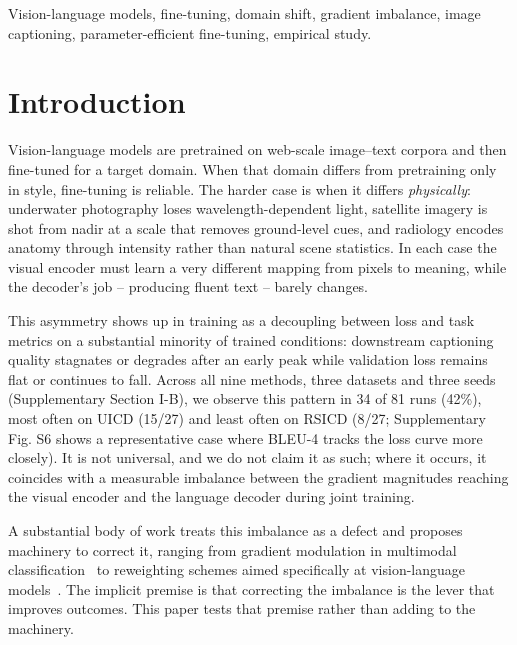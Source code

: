 \documentclass[journal]{IEEEtran}
\begin{document}
\begin{IEEEkeywords}
Vision-language models, fine-tuning, domain shift, gradient
imbalance, image captioning, parameter-efficient fine-tuning,
empirical study.
\end{IEEEkeywords}

\section{Introduction}

Vision-language models are pretrained on web-scale image--text
corpora and then fine-tuned for a target domain. When that domain
differs from pretraining only in style, fine-tuning is reliable. The harder case is when it differs \emph{physically}: underwater
photography loses wavelength-dependent light, satellite imagery is
shot from nadir at a scale that removes ground-level cues, and
radiology encodes anatomy through intensity rather than natural scene statistics. In each case the visual encoder must learn a very different mapping from pixels to meaning, while the decoder's job -- producing fluent text -- barely changes.

This asymmetry shows up in training as a decoupling between loss
and task metrics on a substantial minority of trained conditions:
downstream captioning quality stagnates or degrades after an
early peak while validation loss remains flat or continues to
fall. Across all nine methods, three datasets and three seeds
(Supplementary Section I-B), we observe this pattern in
34 of 81 runs (42\%), most often on UICD (15/27) and least often
on RSICD (8/27; Supplementary Fig. S6 shows a representative
case where BLEU-4 tracks the loss curve more closely). It is not
universal, and we do not claim it as such; where it occurs, it
coincides with a measurable imbalance between the gradient
magnitudes reaching the visual encoder and the language decoder
during joint training.

A substantial body of work treats this imbalance as a defect and
proposes machinery to correct it, ranging from gradient
modulation in multimodal classification~\cite{peng2022ogm,li2023agm,fan2023pmr,guo2024cggm}
to reweighting schemes aimed specifically at vision-language
models~\cite{gim2025seesaw,paretolora2026,li2025mbq}. The
implicit premise is that correcting the imbalance is the lever
that improves outcomes. This paper tests that premise rather than
adding to the machinery.
\end{document}
